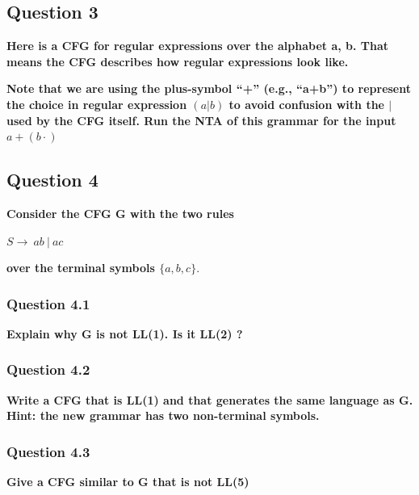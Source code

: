 
\subsection{Question 3}
    \textbf{Here is a CFG for regular expressions over the alphabet {a, b}. That means the CFG describes how regular expressions look like.}

    

    \textbf{Note that we are using the plus-symbol “+” (e.g., “a+b”) to represent the choice in regular expression $(a|b)$ to avoid confusion with the $|$ used by the CFG itself. Run the NTA of this grammar for the input $a + (b \cdot)$}

    

\subsection{Question 4}
    \textbf{Consider the CFG G with the two rules}
    \begin{center}
        $S \rightarrow \ ab \ | \ ac$
    \end{center}
    \textbf{over the terminal symbols $\{a, b, c\}.$}

    \subsubsection{Question 4.1}
        \textbf{Explain why G is not LL(1). Is it LL(2) ?}

        

    \subsubsection{Question 4.2}
        \textbf{Write a CFG that is LL(1) and that generates the same language as G. Hint: the new grammar has two non-terminal symbols.}

        

    \subsubsection{Question 4.3}
        \textbf{Give a CFG similar to G that is not LL(5)}
        
        
